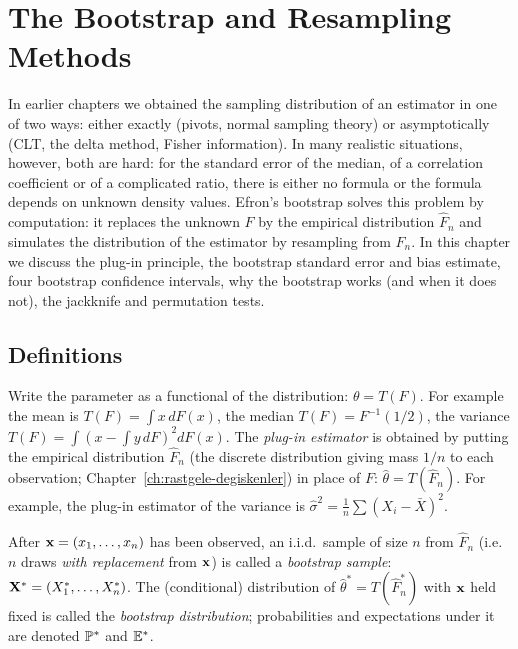 \documentclass[main.tex]{subfiles}
\begin{document}
\chapter{The Bootstrap and Resampling Methods}\label{ch:bootstrap}

In earlier chapters we obtained the sampling distribution of an estimator in one of two ways: either exactly (pivots, normal sampling theory) or asymptotically (CLT, the delta method, Fisher information). In many realistic situations, however, both are hard: for the standard error of the median, of a correlation coefficient or of a complicated ratio, there is either no formula or the formula depends on unknown density values. Efron's \cite{efron79} bootstrap solves this problem by computation: it replaces the unknown $F$ by the empirical distribution $\hat F_n$ and simulates the distribution of the estimator by resampling from $\hat F_n$. In this chapter we discuss the plug-in principle, the bootstrap standard error and bias estimate, four bootstrap confidence intervals, why the bootstrap works (and when it does not), the jackknife and permutation tests.

\section{Definitions}

\begin{definition}\label{def:eklenti}
Write the parameter as a functional of the distribution: $\theta=T(F)$. For example the mean is $T(F)=\int x\,dF(x)$, the median $T(F)=F^{-1}(1/2)$, the variance $T(F)=\int(x-\int y\,dF)^2dF(x)$. The \emph{plug-in estimator} is obtained by putting the empirical distribution $\hat F_n$ (the discrete distribution giving mass $1/n$ to each observation; Chapter~\ref{ch:rastgele-degiskenler}) in place of $F$: $\hat\theta=T(\hat F_n)$. For example, the plug-in estimator of the variance is $\hat\sigma^2=\frac1n\sum(X_i-\bar X)^2$.
\end{definition}

\begin{definition}
After $\x=(x_1,\dots,x_n)$ has been observed, an i.i.d.\ sample of size $n$ from $\hat F_n$ (i.e.\ $n$ draws \emph{with replacement} from $\x$) is called a \emph{bootstrap sample}: $\X^*=(X_1^*,\dots,X_n^*)$. The (conditional) distribution of $\hat\theta^*=T(\hat F_n^*)$ with $\x$ held fixed is called the \emph{bootstrap distribution}; probabilities and expectations under it are denoted $\P^*$ and $\E^*$.
\end{definition}
\end{document}
